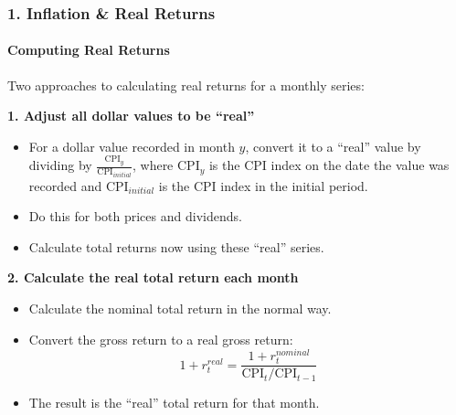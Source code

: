 \documentclass{beamer}
\begin{document}
\begin{frame}[t]
    \frametitle{1. Inflation \& Real Returns}
    \framesubtitle{Computing Real Returns}

    \vspace{-0.5em}
    Two approaches to calculating real returns for a monthly series:
    \vspace{0.5em}

    \textbf{1. Adjust all dollar values to be ``real''}
    \begin{itemize}
        \item For a dollar value recorded in month $y$, convert it to a
        ``real'' value by dividing by
        $\frac{\text{CPI}_y}{\text{CPI}_{initial}}$, where
        $\text{CPI}_y$ is the CPI index on the date the value was recorded
        and $\text{CPI}_{initial}$ is the CPI index in the initial period.

        \item Do this for both prices and dividends.

        \item Calculate total returns now using these ``real''  series.
    \end{itemize}

    \textbf{2. Calculate the real total return each month}
    \begin{itemize}
        \item Calculate the nominal total return in the normal way.

        \item Convert the gross return to a real gross return:
        \[
        1+r_t^{real}
        =
        \frac{1+r_t^{nominal}}
        {\text{CPI}_t/\text{CPI}_{t-1}}
        \]

        \item The result is the ``real'' total return for that month.
    \end{itemize}

\end{frame}
\end{document}
